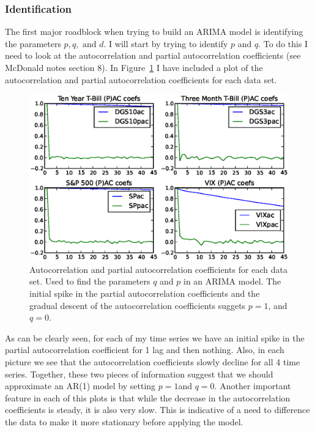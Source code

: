 \documentclass[a4paper, 11pt, twoside]{article}
\theoremstyle{definition} %
\numberwithin{equation}{section}
\begin{document}
    \subsubsection{Identification} \label{ssub:identification}

      The first major roadblock when trying to build an ARIMA model is identifying the parameters $p, q, \text{ and } d$. I will start by trying to identify $p$ and $q$. To do this I need to look at the autocorrelation and partial autocorrelation coefficients (see McDonald notes section 8). In Figure~\ref{fig:correlations} I have included a plot of the autocorrelation and partial autocorrelation coefficients for each data set.

      \begin{figure}[!h]
        \centering
        \includegraphics[width=6in]{./Figures/all_corrs.eps}
        \captionsetup{width=5.5in}
        \caption{\small Autocorrelation and partial autocorrelation coefficients for each data set. Used to find the parameters $q$ and $p$ in an ARIMA model. The initial spike in the partial autocorrelation coefficients and the gradual descent of the autocorrelation coefficients suggets $p=1$, and $q=0$.}
        \label{fig:correlations}
      \end{figure}

      As can be clearly seen, for each of my time series we have an initial spike in the partial autocorrelation coefficient for 1 lag and then nothing. Also, in each picture we see that the autocorrelation coefficients slowly decline for all 4 time series. Together, these two pieces of information suggest that we should approximate an AR(1) model by setting $p = 1 $and $q = 0$. Another important feature in each of this plots is that while the decrease in the autocorrelation coefficients is steady, it is also very slow. This is indicative of a need to difference the data to make it more stationary before applying the model.
\end{document}
